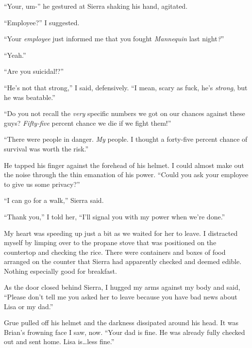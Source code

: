 ``Your, um-'' he gestured at Sierra shaking his hand, agitated.



``Employee?''  I suggested.



``Your \emph{employee} just informed me that you fought \emph{Mannequin }last night\emph{?}''



``Yeah.''



``Are you suicidal!?''



``He's not that strong,'' I said, defensively.  ``I mean, scary as fuck, he's \emph{strong}, but he was beatable.''



``Do you not recall the \emph{very} specific numbers we got on our chances against these guys?  \emph{Fifty-five} percent chance we die if we fight them!''



``There were people in danger.  \emph{My} people.  I thought a forty-five percent chance of survival was worth the risk.''



He tapped his finger against the forehead of his helmet.  I could almost make out the noise through the thin emanation of his power.  ``Could you ask your employee to give us some privacy?''



``I can go for a walk,'' Sierra said.



``Thank you,'' I told her, ``I'll signal you with my power when we're done.''



My heart was speeding up just a bit as we waited for her to leave.  I distracted myself by limping over to the propane stove that was positioned on the countertop and checking the rice.  There were containers and boxes of food arranged on the counter that Sierra had apparently checked and deemed edible.  Nothing especially good for breakfast.



As the door closed behind Sierra, I hugged my arms against my body and said, ``Please don't tell me you asked her to leave because you have bad news about Lisa or my dad.''



Grue pulled off his helmet and the darkness dissipated around his head.  It was Brian's frowning face I saw, now.  ``Your dad is fine.  He was already fully checked out and sent home.  Lisa is\ldots less fine.''




